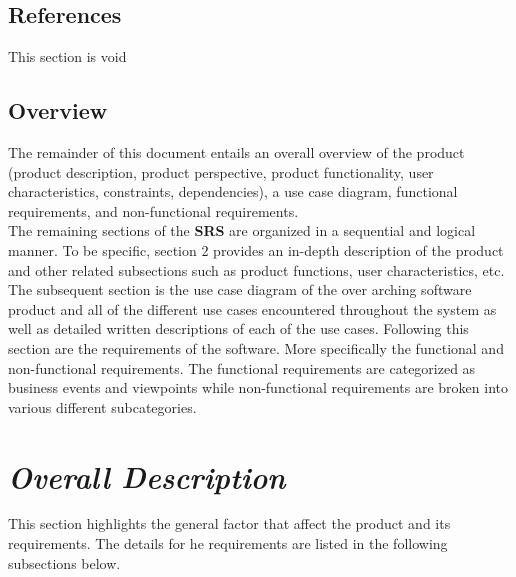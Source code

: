\documentclass[]{article}
\begin{document}


\subsection{References}
\label{sub:references}
This section is  void 

\subsection{Overview}
\label{sub:overview}

The remainder of this document entails an overall overview of the product (product description, product perspective, product functionality, user characteristics, constraints, dependencies), a use case diagram, functional requirements, and non-functional requirements.\\ 

The remaining sections of the \textbf{SRS} are organized in a sequential and logical manner. To be specific, section 2 provides an in-depth description of the product and other related subsections such as product functions, user characteristics, etc. The subsequent section is the use case diagram of the over arching software product and all of the different use cases encountered throughout the system as well as detailed written descriptions of each of the use cases. Following this section are the requirements of the software. More specifically the functional and non-functional requirements. The functional requirements are categorized as business events and viewpoints while non-functional requirements are broken into various different subcategories. 



\section{\textbf{\textit{Overall Description}}}
\label{sec:overall_description}

This section highlights the general factor that affect the product and its requirements. The details for he requirements are listed in the following subsections below. 
\end{document}

